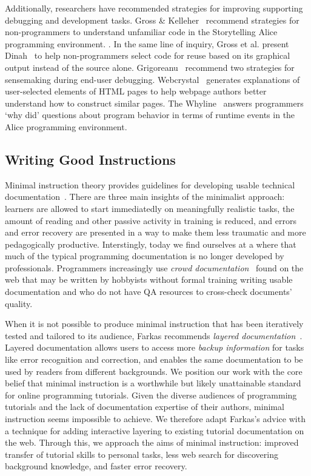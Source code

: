 Additionally, researchers have recommended strategies for improving supporting debugging and development tasks.
Gross \& Kelleher~\cite{gross_non-programmers_2010} recommend strategies for non-programmers to understand unfamiliar code in the Storytelling Alice programming environment.
.
In the same line of inquiry, Gross et al. present Dinah~\cite{gross_dinah_2011} to help non-programmers select code for reuse based on its graphical output instead of the source alone.
Grigoreanu~\cite{grigoreanu_end-user_2012} recommend two strategies for sensemaking during end-user debugging.
Webcrystal~\cite{chang_webcrystal_2012} generates explanations of user-selected elements of HTML pages to help webpage authors better understand how to construct similar pages.
The Whyline~\cite{ko_designing_2004} answers programmers `why did' questions about program behavior in terms of runtime events in the Alice programming environment.

\subsection{Writing Good Instructions}

Minimal instruction theory provides guidelines for developing usable technical documentation~\cite{carroll_nurnberg_1990}.
There are three main insights of the minimalist approach:
learners are allowed to start immediatedly on meaningfully realistic tasks,
the amount of reading and other passive activity in training is reduced,
and errors and error recovery are presented in a way to make them less traumatic and more pedagogically productive.
Interstingly, today we find ourselves at a where that much of the typical programming documentation is no longer developed by professionals.
Programmers increasingly use \emph{crowd documentation}~\cite{parnin_measuring_2011} found on the web that may be written by hobbyists without formal training writing usable documentation and who do not have QA resources to cross-check documents' quality.

When it is not possible to produce minimal instruction that has been iteratively tested and tailored to its audience, Farkas recommends \emph{layered documentation}~\cite{farkas_layering_1998}.
Layered documentation allows users to access more \emph{backup information} for tasks like error recognition and correction, and enables the same documentation to be used by readers from different backgrounds.
We position our work with the core belief that minimal instruction is a worthwhile but likely unattainable standard for online programming tutorials.
Given the diverse audiences of programming tutorials and the lack of documentation expertise of their authors, minimal instruction seems impossible to achieve.
We therefore adapt Farkas's advice with a technique for adding interactive layering to existing tutorial documentation on the web.
Through this, we approach the aims of minimal instruction: improved transfer of tutorial skills to personal tasks, less web search for discovering background knowledge, and faster error recovery.

